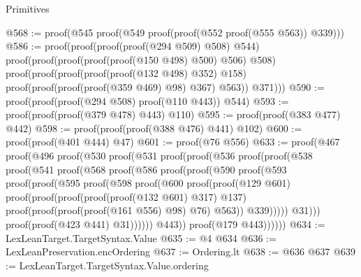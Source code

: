 \begin{lexlean}{Primitives}
\begin{coremodule}
@568 := proof(@545 proof(@549 proof(proof(@552 proof(@555 @563)) @339)))
@586 := proof(proof(proof(proof(@294 @509) @508) @544)
      proof(proof(proof(proof(proof(@150 @498) @500) @506) @508)
          proof(proof(proof(proof(proof(@132 @498) @352) @158)
                proof(proof(proof(proof(@359 @469) @98) @367) @563))
              @371)))
@590 := proof(proof(proof(@294 @508) proof(@110 @443)) @544)
@593 := proof(proof(proof(@379 @478) @443) @110)
@595 := proof(proof(@383 @477) @442)
@598 := proof(proof(proof(@388 @476) @441) @102)
@600 := proof(proof(@401 @444) @47)
@601 := proof(@76 @556)
@633 := proof(@467
      proof(@496
          proof(@530
              proof(@531
                  proof(proof(@536
                        proof(proof(@538
                              proof(@541
                                  proof(@568
                                      proof(@586
                                          proof(proof(@590
                                                proof(@593
                                                    proof(proof(@595
                                                          proof(@598
                                                              proof(@600
                                                                  proof(proof(@129 @601)
                                                                      proof(proof(proof(proof(proof(@132
                                                                                  @601)
                                                                                @317)
                                                                              @137)
                                                                            proof(proof(proof(proof(@161
                                                                                      @556)
                                                                                    @98)
                                                                                  @76)
                                                                                @563))
                                                                          @339)))))
                                                        @31)))
                                              proof(proof(@423 @441) @31))))))
                            @443))
                      proof(@179 @443))))))
@634 := LexLeanTarget.TargetSyntax.Value
@635 := @4 @634
@636 := LexLeanPreservation.encOrdering
@637 := Ordering.lt
@638 := @636 @637
@639 := LexLeanTarget.TargetSyntax.Value.ordering

\end{coremodule}
\end{lexlean}
